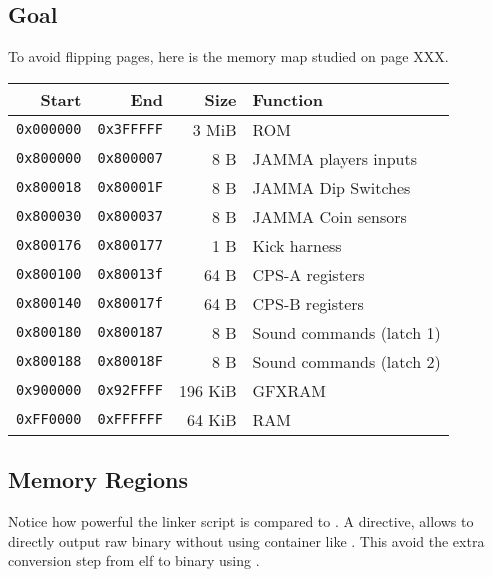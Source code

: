 \subsection{Goal}
To avoid flipping pages, here is the memory map studied on page XXX.

\begin{tabularx}{\textwidth}{rrrX}
\toprule    
  \textbf{Start } & \textbf{End  } & \textbf{Size } & \textbf{Function } \\               
  \toprule    
  \texttt{0x000000} & \texttt{0x3FFFFF} & 3 MiB & ROM \\
  \toprule    
  \texttt{0x800000} & \texttt{0x800007} & 8 B & JAMMA players inputs \\
  \texttt{0x800018} & \texttt{0x80001F} & 8 B & JAMMA Dip Switches \\
  \texttt{0x800030} & \texttt{0x800037} & 8 B & JAMMA Coin sensors \\
  \texttt{0x800176} & \texttt{0x800177} & 1 B & Kick harness \\
\toprule    
  \texttt{0x800100} & \texttt{0x80013f} & 64 B & CPS-A registers\\
  \texttt{0x800140} & \texttt{0x80017f} & 64 B & CPS-B registers\\
\toprule    
  \texttt{0x800180} & \texttt{0x800187} & 8 B & Sound commands (latch 1)\\
  \texttt{0x800188} & \texttt{0x80018F} & 8 B & Sound commands (latch 2)\\
  \toprule    
  \texttt{0x900000} & \texttt{0x92FFFF} & 196 KiB & GFXRAM\\
  \texttt{0xFF0000} & \texttt{0xFFFFFF} & 64 KiB & RAM \\
  \toprule    
\end{tabularx}%

\subsection{Memory Regions}



\begin{trivia}
Notice how powerful the linker script is compared to . A directive,  allows to directly output raw binary without using container like . This avoid the extra conversion step from elf to binary using .
\end{trivia}


